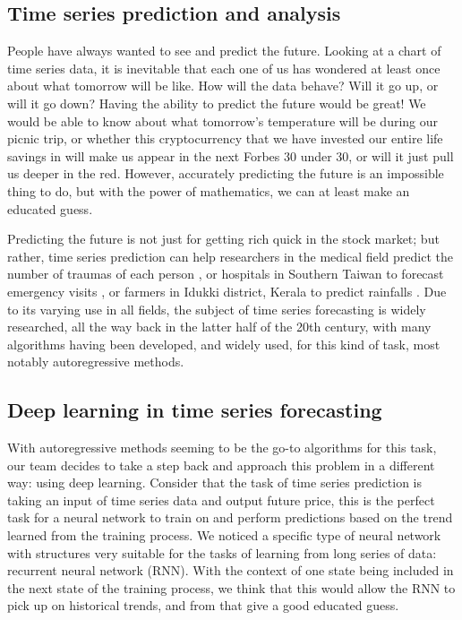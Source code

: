 \documentclass[letterpaper, 10 pt, conference]{ieeeconf}  %
\begin{document}
\subsection{Time series prediction and analysis}
    People have always wanted to see and predict the future. Looking at a chart of time series data, it is inevitable that each one of us has wondered at least once about what tomorrow will be like. How will the data behave? Will it go up, or will it go down? Having the ability to predict the future would be great! We would be able to know about what tomorrow's temperature will be during our picnic trip, or whether this cryptocurrency that we have invested our entire life savings in will make us appear in the next Forbes 30 under 30, or will it just pull us deeper in the red. However, accurately predicting the future is an impossible thing to do, but with the power of mathematics, we can at least make an educated guess.
            
    Predicting the future is not just for getting rich quick in the stock market; but rather, time series prediction can help researchers in the medical field predict the number of traumas of each person \cite{nademi}, or hospitals in Southern Taiwan to forecast emergency visits \cite{Juange018628}, or farmers in Idukki district, Kerala to predict rainfalls \cite{kamath2018}. Due to its varying use in all fields, the subject of time series forecasting is widely researched, all the way back in the latter half of the 20th century, with many algorithms having been developed, and widely used, for this kind of task, most notably autoregressive methods.

\subsection{Deep learning in time series forecasting}
    With autoregressive methods seeming to be the go-to algorithms for this task, our team decides to take a step back and approach this problem in a different way: using deep learning. Consider that the task of time series prediction is taking an input of time series data and output future price, this is the perfect task for a neural network to train on and perform predictions based on the trend learned from the training process. We noticed a specific type of neural network with structures very suitable for the tasks of learning from long series of data: recurrent neural network (RNN). With the context of one state being included in the next state of the training process, we think that this would allow the RNN to pick up on historical trends, and from that give a good educated guess.
\end{document}
